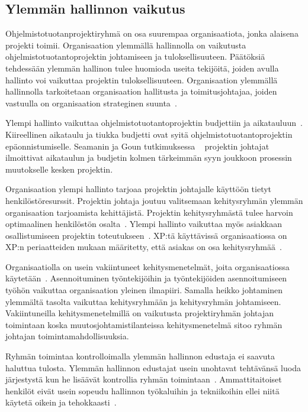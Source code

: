 \documentclass[finnish]{tktltiki2}
\theoremstyle{definition}
\theoremstyle{remark}
\begin{document}
\subsection{Ylemmän hallinnon vaikutus}

Ohjelmistotuotanprojektiryhmä on osa suurempaa organisaatiota, jonka alaisena projekti toimii. Organisaation ylemmällä hallinnolla on vaikutusta ohjelmistotuotantoprojektin johtamiseen ja tuloksellisuuteen. Päätöksiä tehdessään ylemmän hallinon tulee huomioda useita tekijöitä, joiden avulla hallinto voi vaikuttaa projektin tuloksellisuuteen.  Organisaation ylemmällä hallinnolla tarkoitetaan organisaation hallitusta ja toimitusjohtajaa, joiden vastuulla on organisaation strateginen suunta~\cite{McLeod:2011:FAS:1978802.1978803}.

Ylempi hallinto vaikuttaa ohjelmistotuotantoprojektin budjettiin ja aikatauluun~\cite{McLeod:2011:FAS:1978802.1978803}. Kiireellinen aikataulu ja tiukka budjetti ovat syitä ohjelmistotuotantoprojektin epäonnistumiselle. Seamanin ja Goun tutkimuksessa ~\cite{Guo:2008:SSP:1414004.1414046} projektin johtajat ilmoittivat aikataulun ja budjetin kolmen tärkeimmän syyn joukkoon prosessin muutokselle kesken projektin.

Organisaation ylempi hallinto tarjoaa projektin johtajalle käyttöön tietyt henkilöstöresurssit. Projektin johtaja joutuu valitsemaan kehitysryhmän ylemmän organisaation tarjoamista kehittäjistä. Projektin kehitysryhmästä tulee harvoin optimaalinen henkilöstön osalta~\cite{Dhomne:2012:ITL:2382887.2382899}. Ylempi hallinto vaikuttaa myös asiakkaan osallistumiseen projektin toteutukseen~\cite{McLeod:2011:FAS:1978802.1978803}. XP:tä käyttävissä organisaatiossa on XP:n periaatteiden mukaan määritetty, että asiakas on osa kehitysryhmää~\cite{796139}.

Organisaatiolla on usein vakiintuneet kehitysmenetelmät, joita organisaatiossa käytetään~\cite{McLeod:2011:FAS:1978802.1978803}. Asennoituminen työntekijöihin ja työntekijöiden asennoitumiseen työhön vaikuttaa organisaation yleinen ilmapiiri. Samalla heikko johtaminen ylemmältä tasolta vaikuttaa kehitysryhmään ja kehitysryhmän johtamiseen. Vakiintuneilla kehitysmenetelmillä on vaikutusta projektiryhmän johtajan toimintaan koska muutosjohtamistilanteissa kehitysmenetelmä sitoo ryhmän johtajan toimintamahdollisuuksia.

Ryhmän toimintaa kontrolloimalla ylemmän hallinnon edustaja ei saavuta haluttua tulosta. Ylemmän hallinnon edustajat usein unohtavat tehtävänsä luoda järjestystä kun he lisäävät kontrollia ryhmän toimintaan~\cite{Augustine:2005:APM:1101779.1101781}. Ammattitaitoiset henkilöt eivät usein sopeudu hallinnon työkaluihin ja tekniikoihin ellei niitä käytetä oikein ja tehokkaasti~\cite{Augustine:2005:APM:1101779.1101781}.
\end{document}
